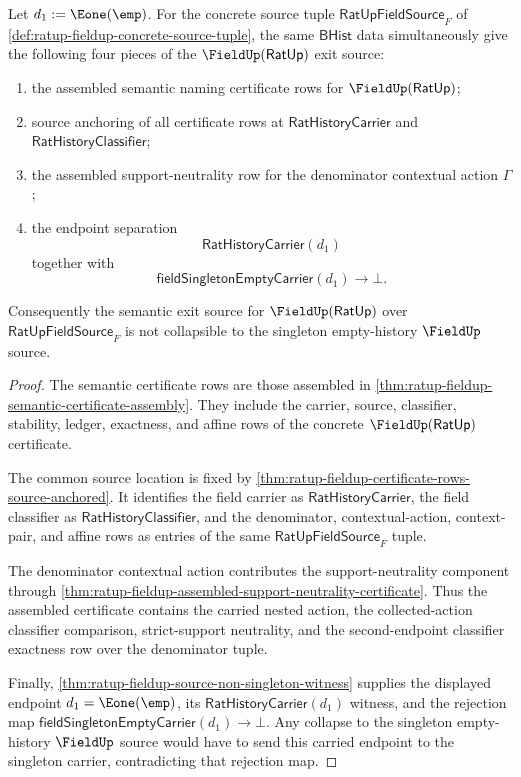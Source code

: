 \begin{theorem}
\label{thm:ratup-fieldup-nondegenerate-semantic-exit}
Let $d_1:=\Eone(\emp)$. For the concrete source tuple
$\mathsf{RatUpFieldSource}_F$ of
\autoref{def:ratup-fieldup-concrete-source-tuple}, the same $\mathsf{BHist}$
data simultaneously give the following four pieces of the
$\FieldUp(\mathsf{RatUp})$ exit source:
\begin{enumerate}
  \item the assembled semantic naming certificate rows for
  $\FieldUp(\mathsf{RatUp})$;
  \item source anchoring of all certificate rows at
  $\mathsf{RatHistoryCarrier}$ and $\mathsf{RatHistoryClassifier}$;
  \item the assembled support-neutrality row for the denominator contextual
  action $\Gamma$;
  \item the endpoint separation
  $$
  \mathsf{RatHistoryCarrier}(d_1)
  $$
  together with
  $$
  \mathsf{fieldSingletonEmptyCarrier}(d_1)\to\bot.
  $$
\end{enumerate}
Consequently the semantic exit source for $\FieldUp(\mathsf{RatUp})$ over
$\mathsf{RatUpFieldSource}_F$ is not collapsible to the singleton empty-history
$\FieldUp$ source.
\end{theorem}
\begin{proof}
The semantic certificate rows are those assembled in
\autoref{thm:ratup-fieldup-semantic-certificate-assembly}. They include the
carrier, source, classifier, stability, ledger, exactness, and affine rows of
the concrete $\FieldUp(\mathsf{RatUp})$ certificate.

The common source location is fixed by
\autoref{thm:ratup-fieldup-certificate-rows-source-anchored}. It identifies the
field carrier as $\mathsf{RatHistoryCarrier}$, the field classifier as
$\mathsf{RatHistoryClassifier}$, and the denominator, contextual-action,
context-pair, and affine rows as entries of the same
$\mathsf{RatUpFieldSource}_F$ tuple.

The denominator contextual action contributes the support-neutrality component
through \autoref{thm:ratup-fieldup-assembled-support-neutrality-certificate}.
Thus the assembled certificate contains the carried nested action, the
collected-action classifier comparison, strict-support neutrality, and the
second-endpoint classifier exactness row over the denominator tuple.

Finally,
\autoref{thm:ratup-fieldup-source-non-singleton-witness} supplies the displayed
endpoint $d_1=\Eone(\emp)$, its
$\mathsf{RatHistoryCarrier}(d_1)$ witness, and the rejection map
$\mathsf{fieldSingletonEmptyCarrier}(d_1)\to\bot$. Any collapse to the singleton
empty-history $\FieldUp$ source would have to send this carried endpoint to the
singleton carrier, contradicting that rejection map.
\end{proof}

